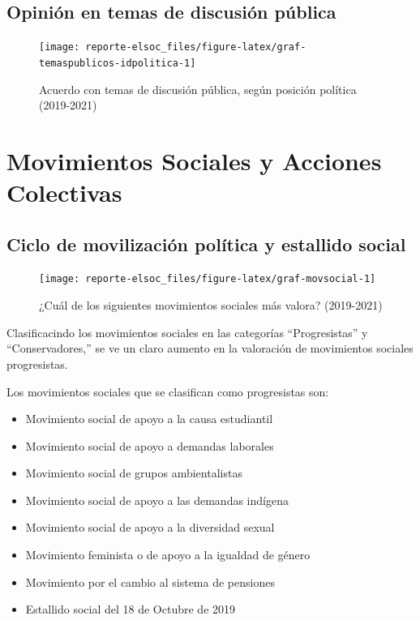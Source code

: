 \documentclass[
  12pt,
]{book}
\providecommand{\tightlist}{%
  \setlength{\itemsep}{0pt}\setlength{\parskip}{0pt}}
\begin{document}
\hypertarget{opiniuxf3n-en-temas-de-discusiuxf3n-puxfablica}{%
\subsection{Opinión en temas de discusión pública}\label{opiniuxf3n-en-temas-de-discusiuxf3n-puxfablica}}

\begin{figure}

{\centering \texttt{[image: reporte-elsoc\_files/figure-latex/graf-temaspublicos-idpolitica-1]} 

}

\caption{Acuerdo con temas de discusión pública, según posición política (2019-2021)}\label{fig:graf-temaspublicos-idpolitica}
\end{figure}

\hypertarget{movimientos-sociales-y-acciones-colectivas}{%
\section{Movimientos Sociales y Acciones Colectivas}\label{movimientos-sociales-y-acciones-colectivas}}

\hypertarget{ciclo-de-movilizaciuxf3n-poluxedtica-y-estallido-social}{%
\subsection{Ciclo de movilización política y estallido social}\label{ciclo-de-movilizaciuxf3n-poluxedtica-y-estallido-social}}

\begin{figure}

{\centering \texttt{[image: reporte-elsoc\_files/figure-latex/graf-movsocial-1]} 

}

\caption{¿Cuál de los siguientes movimientos sociales más valora? (2019-2021)}\label{fig:graf-movsocial}
\end{figure}

Clasificacindo los movimientos sociales en las categorías ``Progresistas'' y ``Conservadores,'' se ve un claro aumento en la valoración de movimientos sociales progresistas.

Los movimientos sociales que se clasifican como progresistas son:

\begin{itemize}
\tightlist
\item
  Movimiento social de apoyo a la causa estudiantil
\item
  Movimiento social de apoyo a demandas laborales
\item
  Movimiento social de grupos ambientalistas
\item
  Movimiento social de apoyo a las demandas indígena
\item
  Movimiento social de apoyo a la diversidad sexual
\item
  Movimiento feminista o de apoyo a la igualdad de género
\item
  Movimiento por el cambio al sistema de pensiones
\item
  Estallido social del 18 de Octubre de 2019
\end{itemize}
\end{document}
